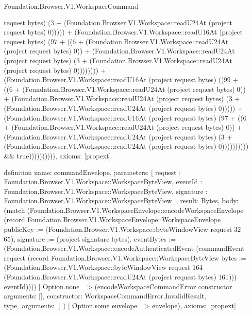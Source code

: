 \begin{lexlean}{Foundation.Browser.V1.WorkspaceCommand}
\begin{semanticmodule}
{request bytes) (3 + (Foundation.Browser.V1.Workspace::readU24At (project request bytes) 0))))) + (Foundation.Browser.V1.Workspace::readU16At (project request bytes) (97 + ((6 + (Foundation.Browser.V1.Workspace::readU24At (project request bytes) 0)) + (Foundation.Browser.V1.Workspace::readU24At (project request bytes) (3 + (Foundation.Browser.V1.Workspace::readU24At (project request bytes) 0)))))))) + (Foundation.Browser.V1.Workspace::readU16At (project request bytes) ((99 + ((6 + (Foundation.Browser.V1.Workspace::readU24At (project request bytes) 0)) + (Foundation.Browser.V1.Workspace::readU24At (project request bytes) (3 + (Foundation.Browser.V1.Workspace::readU24At (project request bytes) 0))))) + (Foundation.Browser.V1.Workspace::readU16At (project request bytes) (97 + ((6 + (Foundation.Browser.V1.Workspace::readU24At (project request bytes) 0)) + (Foundation.Browser.V1.Workspace::readU24At (project request bytes) (3 + (Foundation.Browser.V1.Workspace::readU24At (project request bytes) 0)))))))))) && true)))))))))),
  axioms: [propext]
}

definition{
  name: commandEnvelope,
  parameters: [
    request : Foundation.Browser.V1.Workspace::WorkspaceByteView,
    eventId : Foundation.Browser.V1.Workspace::WorkspaceByteView,
    signature : Foundation.Browser.V1.Workspace::WorkspaceByteView
  ],
  result: Bytes,
  body: (match (Foundation.Browser.V1.WorkspaceEnvelope::encodeWorkspaceEnvelope (record Foundation.Browser.V1.WorkspaceEnvelope::WorkspaceEnvelope {publicKey := (Foundation.Browser.V1.Workspace::byteWindowView request 32 65), signature := (project signature bytes), eventBytes := (Foundation.Browser.V1.Workspace::encodeAuthenticatedEvent (commandEvent request (record Foundation.Browser.V1.Workspace::WorkspaceByteView {bytes := (Foundation.Browser.V1.Workspace::byteWindowView request 164 (Foundation.Browser.V1.Workspace::readU24At (project request bytes) 161))}) eventId))}))
    | Option.none => (encodeWorkspaceCommandError constructor{
      arguments: [],
      constructor: WorkspaceCommandError.InvalidResult,
      type_arguments: []
    })
    | Option.some envelope => envelope),
  axioms: [propext]
}


\end{semanticmodule}
\end{lexlean}

